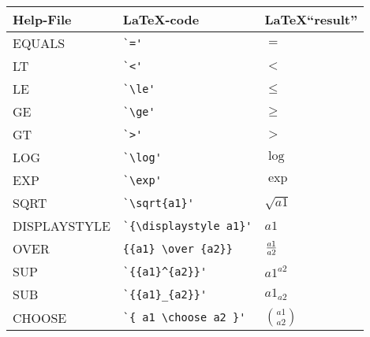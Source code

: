 \documentclass[a4paper,11pt]{article}
\begin{document}
\begin{center}
\begin{tabular}{l@{\ \ $\to$\ \ }p{12em}@{\ \ $\longrightarrow$\ \ }l}
\hline
Help-File & \LaTeX-code & \LaTeX ``result'' \\
\hline\hline

EQUALS          & \verb#`='#    & $ = $ \\
LT              & \verb#`<'#    & $ < $ \\
LE              & \verb#`\le'#  & $ \le $ \\
GE              & \verb#`\ge'#  & $ \ge $ \\
GT              & \verb#`>'#    & $ > $ \\
LOG             & \verb#`\log'#         & $ \log $ \\
EXP             & \verb#`\exp'#         & $ \exp $ \\
SQRT            & \verb#`\sqrt{a1}'#    & $ \sqrt{a1} $ \\
DISPLAYSTYLE    & \verb#`{\displaystyle a1}'#   & $ {\displaystyle a1} $ \\
OVER            & \verb#{{a1} \over {a2}}#      & $ {{a1} \over {a2}} $ \\
SUP             & \verb#`{{a1}^{a2}}'#  & $ {{a1}^{a2}} $ \\
SUB             & \verb#`{{a1}_{a2}}'#  & $ {{a1}_{a2}} $ \\
CHOOSE          & \verb#`{ a1 \choose a2 }'#    & $ { a1 \choose a2 } $ \\

\end{tabular}
\end{center}
\end{document}
